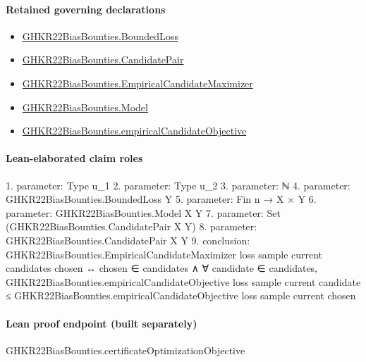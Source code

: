 \documentclass[10pt]{article}
\begin{document}
\paragraph{Retained governing declarations}
\begin{itemize}\raggedright
\item \hyperlink{paper-prerequisite-ef6c319b0770dad4}{GHKR22\allowbreak{}Bias\allowbreak{}Bounties.\allowbreak{}Bounded\allowbreak{}Loss}
\item \hyperlink{governing-declaration-373b79d2a57e81fc}{GHKR22\allowbreak{}Bias\allowbreak{}Bounties.\allowbreak{}Candidate\allowbreak{}Pair}
\item \hyperlink{governing-declaration-daea737e22261424}{GHKR22\allowbreak{}Bias\allowbreak{}Bounties.\allowbreak{}Empirical\allowbreak{}Candidate\allowbreak{}Maximizer}
\item \hyperlink{paper-prerequisite-333127605c12eba8}{GHKR22\allowbreak{}Bias\allowbreak{}Bounties.\allowbreak{}Model}
\item \hyperlink{governing-declaration-dc9f873a9d9fc764}{GHKR22\allowbreak{}Bias\allowbreak{}Bounties.\allowbreak{}empirical\allowbreak{}Candidate\allowbreak{}Objective}
\end{itemize}
\paragraph{Lean-elaborated claim roles}\begin{ReviewVerbatim}
1. parameter: Type u_1
2. parameter: Type u_2
3. parameter: ℕ
4. parameter: GHKR22BiasBounties.BoundedLoss Y
5. parameter: Fin n → X × Y
6. parameter: GHKR22BiasBounties.Model X Y
7. parameter: Set (GHKR22BiasBounties.CandidatePair X Y)
8. parameter: GHKR22BiasBounties.CandidatePair X Y
9. conclusion: GHKR22BiasBounties.EmpiricalCandidateMaximizer loss sample current candidates chosen ↔
  chosen ∈ candidates ∧
    ∀ candidate ∈ candidates,
      GHKR22BiasBounties.empiricalCandidateObjective loss sample current candidate ≤
        GHKR22BiasBounties.empiricalCandidateObjective loss sample current chosen
\end{ReviewVerbatim}

\paragraph{Lean proof endpoint (built separately)}\begin{ReviewVerbatim}
GHKR22BiasBounties.certificateOptimizationObjective
\end{ReviewVerbatim}
\end{document}
